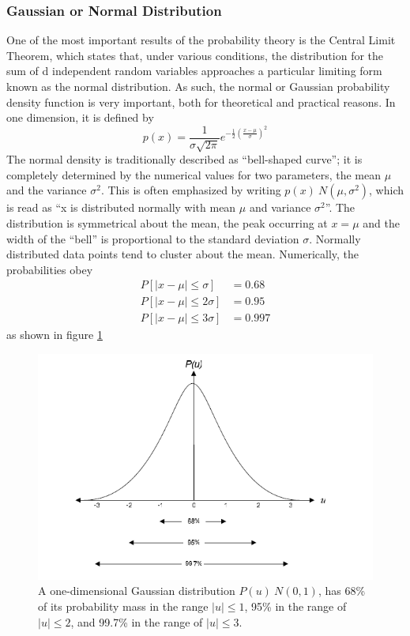 \documentclass[12pt, a4paper, twoside]{report}
\begin{document}
\subsubsection{Gaussian or Normal Distribution}
One of the most important results of the probability theory is the Central Limit Theorem, which states that, under various conditions, the distribution for the sum of d independent random variables approaches a particular limiting form known as the normal distribution. As such, the normal or Gaussian probability density function is very important, both for theoretical and practical reasons. In one dimension, it is defined by
\begin{equation*}
p(x) = \frac{1}{\sigma \sqrt{2\pi }} e^{-\frac{1}{2}\left ( \frac{x-\mu }{\sigma } \right )^{2}}
\end{equation*}
The normal density is traditionally described as ``bell-shaped curve''; it is completely determined by the numerical values for two parameters, the mean $\mu$ and the variance $\sigma^2$. This is often emphasized by writing $p(x)~N(\mu,\sigma^2)$, which is read as ``x is distributed normally with mean $\mu$ and variance $\sigma^2$''. The distribution is symmetrical about the mean, the peak occurring at $x=\mu$ and the width of the ``bell'' is proportional to the standard deviation $\sigma$. Normally distributed data points tend to cluster about the mean. Numerically, the probabilities obey
\begin{align}
P[|x-\mu| \leq \sigma] &= 0.68 \nonumber \\ 
P[|x-\mu| \leq 2\sigma] &= 0.95 \nonumber \\ 
P[|x-\mu| \leq 3\sigma] &= 0.997 \label{eq:gaussian-majority}
\end{align}
as shown in figure \ref{fig:gaussian}
\begin{figure}[ht]
	\centering
	\includegraphics[width=1\textwidth]
	{images/chapter2/gaussian}
	\caption{A one-dimensional Gaussian distribution $P(u)~N(0,1)$, has 68\% of its probability mass in the range $|u|\leq 1$, 95\% in the range of $|u|\leq 2$, and 99.7\% in the range of $|u|\leq 3$.}
	\label{fig:gaussian}
\end{figure}
\end{document}
